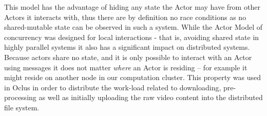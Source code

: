 This model has the advantage of hiding any state the Actor may have from other Actors it interacts with, thus there are by definition no race conditions as no shared-mutable state can be observed in such a system. While the Actor Model of concurrency was designed for local interactions - that is, avoiding shared state in highly parallel systems it also has a significant impact on distributed systems. Because actors share no state, and it is only possible to interact with an Actor using messages it does not matter \textit{where} an Actor is residing -- for example it might reside on another node in our computation cluster. This property was used in Oclus in order to distribute the work-load related to downloading, pre-processing as well as initially uploading the raw video content into the distributed file system.


